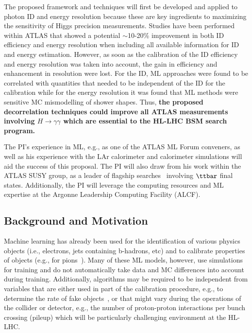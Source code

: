 \documentclass[letter, USenglish, 11pt, subfigure]{article}
\begin{document}
The proposed framework and techniques will first be developed and applied to photon ID and energy resolution because these are key ingredients to maximizing the sensitivity of Higgs precision measurements. Studies have been performed within ATLAS that showed a potential $\sim$10-20\% improvement in both ID efficiency and energy resolution when including all available information for ID and energy estimation. However, as soon as the calibration of the ID efficiency and energy resolution was taken into account, the gain in efficiency and enhancement in resolution were lost. For the ID, ML approaches were found to be correlated with quantities that needed to be independent of the ID for the calibration while for the energy resolution it was found that ML methods were sensitive MC mismodelling of shower shapes. Thus, {\bf the proposed decorrelation techniques could improve all ATLAS measurements involving $H\to\gamma\gamma$ which are essential to the HL-LHC BSM search program.}

The PI's experience in ML, e.g., as one of the ATLAS ML Forum conveners, as well as his experience with the LAr calorimeter and calorimeter simulations will aid the success of this proposal. The PI will also draw from his work within the ATLAS SUSY group, as a leader of flagship searches~\cite{stop0L_1,stopRun1,stop0L_2,stop0L_3} involving $\ttbar$ final states. Additionally, the PI will leverage the computing resources and ML expertise at the Argonne Leadership Computing Facility (ALCF).


\subsection{Background and Motivation}

Machine learning has already been used for the identification of various physics objects (i.e., electrons, jets containing b-hadrons, etc) and to calibrate properties of objects (e.g., for pions~\cite{ATL-PHYS-PUB-2020-018}). Many of these ML models, however, use simulations for training and do not automatically take data and MC differences into account during training. Additionally, algorithms may be required to be independent from variables that are either used in part of the calibration procedure, e.g., to determine the rate of fake objects~\cite{atlas_photon_id}, or that might vary during the operations of the collider or detector, e.g., the number of proton-proton interactions per bunch crossing (pileup) which will be particularly challenging environment at the HL-LHC.
\end{document}

